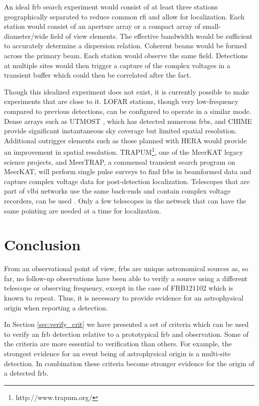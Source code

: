 \documentclass[a4paper,fleqn,usenatbib]{mnras}
\begin{document}
An ideal \gls{frb} search experiment would consist of at least three stations
geographically separated to reduce common \gls{rfi} and allow for localization.
Each station would consist of an aperture array or a compact array of
small-diameter/wide field of view elements. The effective bandwidth would be
sufficient to accurately determine a dispersion relation.  Coherent beams would
be formed across the primary beam. Each station would observe the same field.
Detections at multiple sites would then trigger a capture of the complex
voltages in a transient buffer which could then be correlated after the fact. 

Though this idealized experiment does not exist, it is currently possible to
make experiments that are close to it. LOFAR stations, though very low-frequency
compared to previous detections, can be configured to operate in a similar mode.
Dense arrays such as UTMOST \citep{2017MNRAS.468.3746C}, which has detected
numerous \glspl{frb}, and CHIME \citep{Chime2018} provide significant
instantaneous sky coverage but limited spatial resolution. Additional outrigger
elements such as those planned with HERA \citep{2017PASP..129d5001D} would
provide an improvement in spatial resolution.
TRAPUM\footnote{http://www.trapum.org/}, one of the MeerKAT legacy science
projects,  and MeerTRAP, a commensal transient search program on MeerKAT, will
perform single pulse surveys to find \glspl{frb} in beamformed data and capture
complex voltage data for post-detection localization.  Telescopes that are part
of \gls{vlbi} networks use the same back-ends and contain complex voltage
recorders, can be used \citep{2018arXiv180401904W}. Only a few telescopes in the
network that can have the same pointing are needed at a time for localization.

\section{Conclusion}

From an observational point of view, \glspl{frb} are unique astronomical sources
as, so far, no follow-up observations have been able to verify a source using a
different telescope or observing frequency, except in the case of FRB121102
which is known to repeat. Thus, it is necessary to provide evidence for an
astrophysical origin when reporting a detection.

In Section \ref{sec:verify_crit} we have presented a set of criteria which can
be used to verify an \gls{frb} detection relative to a prototypical \gls{frb}
and observation. Some of the criteria are more essential to verification than
others.  For example, the strongest evidence for an event being of astrophysical
origin is a multi-site detection.  In combination these criteria become stronger
evidence for the origin of a detected \gls{frb}.
\end{document}
